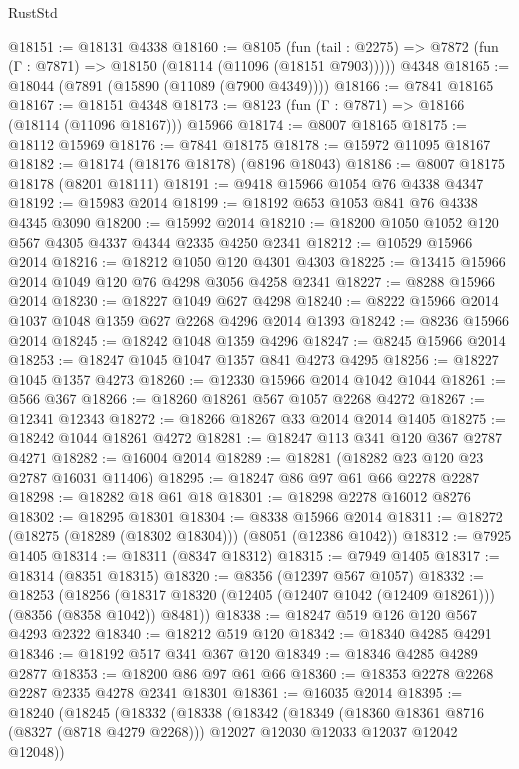 \begin{lexlean}{RustStd}
\begin{coremodule}
@18151 := @18131 @4338
@18160 := @8105
    (fun (tail : @2275) => @7872 (fun (Γ : @7871) => @18150 (@18114 (@11096 (@18151 @7903)))))
    @4348
@18165 := @18044 (@7891 (@15890 (@11089 (@7900 @4349))))
@18166 := @7841 @18165
@18167 := @18151 @4348
@18173 := @8123 (fun (Γ : @7871) => @18166 (@18114 (@11096 @18167))) @15966
@18174 := @8007 @18165
@18175 := @18112 @15969
@18176 := @7841 @18175
@18178 := @15972 @11095 @18167
@18182 := @18174 (@18176 @18178) (@8196 @18043)
@18186 := @8007 @18175 @18178 (@8201 @18111)
@18191 := @9418 @15966 @1054 @76 @4338 @4347
@18192 := @15983 @2014
@18199 := @18192 @653 @1053 @841 @76 @4338 @4345 @3090
@18200 := @15992 @2014
@18210 := @18200 @1050 @1052 @120 @567 @4305 @4337 @4344 @2335 @4250 @2341
@18212 := @10529 @15966 @2014
@18216 := @18212 @1050 @120 @4301 @4303
@18225 := @13415 @15966 @2014 @1049 @120 @76 @4298 @3056 @4258 @2341
@18227 := @8288 @15966 @2014
@18230 := @18227 @1049 @627 @4298
@18240 := @8222 @15966 @2014 @1037 @1048 @1359 @627 @2268 @4296 @2014 @1393
@18242 := @8236 @15966 @2014
@18245 := @18242 @1048 @1359 @4296
@18247 := @8245 @15966 @2014
@18253 := @18247 @1045 @1047 @1357 @841 @4273 @4295
@18256 := @18227 @1045 @1357 @4273
@18260 := @12330 @15966 @2014 @1042 @1044
@18261 := @566 @367
@18266 := @18260 @18261 @567 @1057 @2268 @4272
@18267 := @12341 @12343
@18272 := @18266 @18267 @33 @2014 @2014 @1405
@18275 := @18242 @1044 @18261 @4272
@18281 := @18247 @113 @341 @120 @367 @2787 @4271
@18282 := @16004 @2014
@18289 := @18281 (@18282 @23 @120 @23 @2787 @16031 @11406)
@18295 := @18247 @86 @97 @61 @66 @2278 @2287
@18298 := @18282 @18 @61 @18
@18301 := @18298 @2278 @16012 @8276
@18302 := @18295 @18301
@18304 := @8338 @15966 @2014
@18311 := @18272 (@18275 (@18289 (@18302 @18304))) (@8051 (@12386 @1042))
@18312 := @7925 @1405
@18314 := @18311 (@8347 @18312)
@18315 := @7949 @1405
@18317 := @18314 (@8351 @18315)
@18320 := @8356 (@12397 @567 @1057)
@18332 := @18253
    (@18256 (@18317 @18320 (@12405 (@12407 @1042 (@12409 @18261))) (@8356 (@8358 @1042)) @8481))
@18338 := @18247 @519 @126 @120 @567 @4293 @2322
@18340 := @18212 @519 @120
@18342 := @18340 @4285 @4291
@18346 := @18192 @517 @341 @367 @120
@18349 := @18346 @4285 @4289 @2877
@18353 := @18200 @86 @97 @61 @66
@18360 := @18353 @2278 @2268 @2287 @2335 @4278 @2341 @18301
@18361 := @16035 @2014
@18395 := @18240
    (@18245
      (@18332
        (@18338
          (@18342
            (@18349
              (@18360 @18361 @8716 (@8327 (@8718 @4279 @2268)))
              @12027
              @12030
              @12033
              @12037
              @12042
              @12048))

\end{coremodule}
\end{lexlean}
